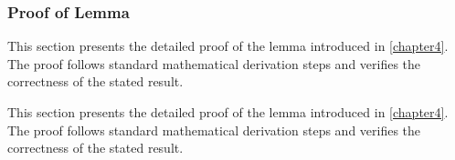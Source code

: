 \subsubsection{Proof of Lemma}
\begin{subsubparagraph}
This section presents the detailed proof of the lemma introduced in \autoref{chapter4}. The proof follows standard mathematical derivation steps and verifies the correctness of the stated result.

This section presents the detailed proof of the lemma introduced in \autoref{chapter4}. The proof follows standard mathematical derivation steps and verifies the correctness of the stated result.
\end{subsubparagraph}
